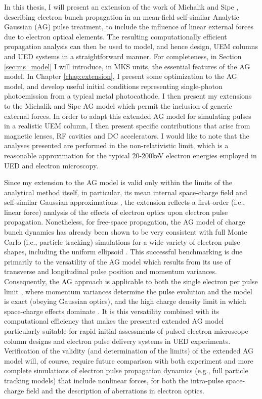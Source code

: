 In this thesis, I will present an extension of the work of Michalik and Sipe \cite{michalik_analytic_2006,michalik_erratum:_2008}, describing electron bunch propagation in an mean-field self-similar Analytic Gaussian (AG) pulse treatment, to include the influence of linear external forces due to electron optical elements.
The resulting computationally efficient propagation analysis can then be used to model, and hence design, UEM columns and UED systems in a straightforward manner.
For completeness, in Section \ref{sec:ms_model} I will introduce, in MKS units, the essential features of the AG model.
In Chapter \ref{chap:extension}, I present some optimization to the AG model, and develop useful initial conditions representing single-photon photoemission from a typical metal photocathode.
I then present my extensions to the Michalik and Sipe AG model which permit the inclusion of generic external forces.
In order to adapt this extended AG model for simulating pulses in a realistic UEM column, I then present specific contributions that arise from magnetic lenses, RF cavities and DC accelerators.
I would like to note that the analyses presented are performed in the non-relativistic limit, which is a reasonable approximation for the typical 20-200keV electron energies employed in UED and electron microscopy.

Since my extension to the AG model is valid only within the limits of the analytical method itself, in particular, its mean internal space-charge field and self-similar Gaussian approximations \cite{michalik_analytic_2006}, the extension reflects a first-order (i.e., linear force) analysis of the effects of electron optics upon electron pulse propagation.
Nonetheless, for free-space propagation, the AG model of charge bunch dynamics has already been shown to be very consistent with full Monte Carlo (i.e., particle tracking) simulations for a wide variety of electron pulse shapes,\cite{michalik_analytic_2006,michalik_evolution_2009} including the uniform ellipsoid \cite{luiten_how_2004}.
This successful benchmarking is due primarily to the versatility of the AG model which results from its use of transverse and longitudinal pulse position and momentum variances.
Consequently, the AG approach is applicable to both the single electron per pulse limit \cite{lobastov_four-dimensional_2005}, where momentum variances determine the pulse evolution and the model is exact (obeying Gaussian optics), and the high charge density limit in which space-charge effects dominate \cite{luiten_how_2004,siwick_ultrafast_2002,cao_femtosecond_2003}.
It is this versatility combined with its computational efficiency that makes the presented extended AG model particularly suitable for rapid initial assessments of pulsed electron microscope column designs and electron pulse delivery systems in UED experiments.
Verification of the validity (and determination of the limits) of the extended AG model will, of course, require future comparison with both experiment and more complete simulations of electron pulse propagation dynamics (e.g., full particle tracking models) that include nonlinear forces, for both the intra-pulse space-charge field and the description of aberrations in electron optics.


